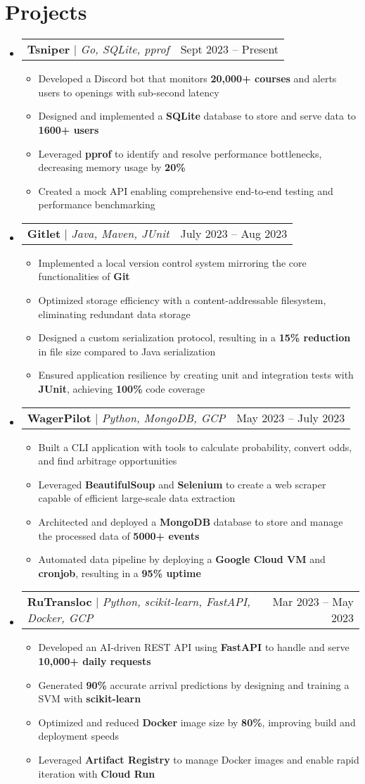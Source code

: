 \documentclass[letterpaper,11pt]{article}
\makeatletter
\newcommand{\resumeItem}[1]{
  \item\small{
    {#1 \vspace{-2pt}}
  }
}
\newcommand{\resumeProjectHeading}[2]{
    \item
    \begin{tabular*}{0.97\textwidth}{l@{\extracolsep{\fill}}r}
      \small#1 & #2 \\
    \end{tabular*}\vspace{-7pt}
}
\newcommand{\resumeSubHeadingListStart}{\begin{itemize}[leftmargin=0.15in, label={}]}
\newcommand{\resumeSubHeadingListEnd}{\end{itemize}}
\newcommand{\resumeItemListStart}{\begin{itemize}}
\newcommand{\resumeItemListEnd}{\end{itemize}\vspace{-3pt}}
\makeatother
\begin{document}
\section{Projects}
    \resumeSubHeadingListStart
      \resumeProjectHeading
          {\textbf{Tsniper} $|$ \emph{Go, SQLite, pprof}}{Sept 2023 -- Present}
          \resumeItemListStart
            \resumeItem{Developed a Discord bot that monitors \textbf{20,000+ courses} and alerts users to openings with sub-second latency}
            \resumeItem{Designed and implemented a \textbf{SQLite} database to store and serve data to \textbf{1600+ users}}
            \resumeItem{Leveraged \textbf{pprof} to identify and resolve performance bottlenecks, decreasing memory usage by \textbf{20\%}}
            \resumeItem{Created a mock API enabling comprehensive end-to-end testing and performance benchmarking}
          \resumeItemListEnd
      \resumeProjectHeading
          {\textbf{Gitlet} $|$ \emph{Java, Maven, JUnit}}{July 2023 -- Aug 2023}
      \resumeItemListStart  
            \resumeItem{Implemented a local version control system mirroring the core functionalities of \textbf{Git}}
            \resumeItem{Optimized storage efficiency with a content-addressable filesystem, eliminating redundant data storage}
            \resumeItem{Designed a custom serialization protocol, resulting in a \textbf{15\% reduction} in file size compared to Java serialization}
            \resumeItem{Ensured application resilience by creating unit and integration tests with \textbf{JUnit}, achieving \textbf{100\%} code coverage}
          \resumeItemListEnd
      \resumeProjectHeading
          {\textbf{WagerPilot} $|$ \emph{Python, MongoDB, GCP}}{May 2023 -- July 2023}
          \resumeItemListStart
            \resumeItem{Built a CLI application with tools to calculate probability, convert odds, and find arbitrage opportunities}
            \resumeItem{Leveraged \textbf{BeautifulSoup} and \textbf{Selenium} to create a web scraper capable of efficient large-scale data extraction}
            \resumeItem{Architected and deployed a \textbf{MongoDB} database to store and manage the processed data of \textbf{5000+ events}}
            \resumeItem{Automated data pipeline by deploying a \textbf{Google Cloud VM} and \textbf{cronjob}, resulting in a \textbf{95\% uptime}}
          \resumeItemListEnd
      \resumeProjectHeading
          {\textbf{RuTransloc} $|$ \emph{Python, scikit-learn, FastAPI, Docker, GCP}}{Mar 2023 -- May 2023}
          \resumeItemListStart
            \resumeItem{Developed an AI-driven REST API using \textbf{FastAPI} to handle and serve \textbf{10,000+ daily requests}}
            \resumeItem{Generated \textbf{90\%} accurate arrival predictions by designing and training a SVM with \textbf{scikit-learn}}
            \resumeItem{Optimized and reduced \textbf{Docker} image size by \textbf{80\%}, improving build and deployment speeds}
            \resumeItem{Leveraged \textbf{Artifact Registry} to manage Docker images and enable rapid iteration with \textbf{Cloud Run}}
          \resumeItemListEnd
    \resumeSubHeadingListEnd
\end{document}
